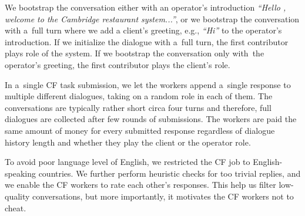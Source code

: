 \documentclass[runningheads,a4paper]{llncs}
\begin{document}
We bootstrap the conversation either with an operator's introduction {\it ``Hello , welcome to the Cambridge restaurant system...''}, or we bootstrap the conversation with a~full turn where we add a client's greeting, e.g., {\it ``Hi''} to the operator's introduction.
If we initialize the dialogue with a~full turn, the first contributor plays role of the system. If we bootstrap the conversation only with~the operator's greeting, the first contributor plays the client's role.

In a~single CF task submission, we let the workers append a~single response to multiple different dialogues, taking on a random role in each of them.
The conversations are typically rather short circa four turns and therefore, full dialogues are collected after few rounds of submissions.
The workers are paid  the same amount of money for every submitted response regardless of dialogue history length and whether they play the client or the operator role.

To avoid poor language level of English, we restricted the CF job to English-speaking countries.
We further perform heuristic checks for too trivial replies, and we enable the CF workers to rate each other's responses.
This help us filter low-quality conversations, but more importantly, it motivates the CF workers not to cheat.
\end{document}

